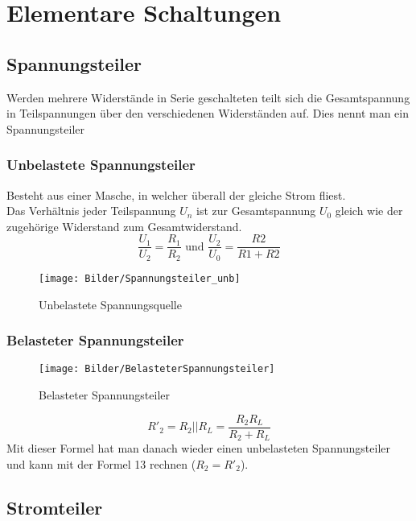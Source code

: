 \documentclass{article}
\begin{document}
\section{Elementare Schaltungen}
\subsection{Spannungsteiler}
Werden mehrere Widerstände in Serie geschalteten teilt sich die Gesamtspannung in Teilspannungen über den verschiedenen Widerständen auf. Dies nennt man ein Spannungsteiler
\subsubsection{Unbelastete Spannungsteiler}
Besteht aus einer Masche, in welcher überall der gleiche Strom fliest. \\
Das Verhältnis jeder Teilspannung $U_n$ ist zur Gesamtspannung $U_0$ gleich wie der zugehörige Widerstand zum Gesamtwiderstand. 
\begin{equation}
	\frac{U_1}{U_2} = \frac{R_1}{R_2} \textrm{ und } \frac{U_2}{U_0} = \frac{R2}{R1 + R2}
\end{equation}
\begin{figure}[htbp]
	\centering
	\texttt{[image: Bilder/Spannungsteiler\_unb]}
	\caption{Unbelastete Spannungsquelle}
\end{figure}
\subsubsection{Belasteter Spannungsteiler}
\begin{figure}[htbp]
	\centering
	\texttt{[image: Bilder/BelasteterSpannungsteiler]}
	\caption{Belasteter Spannungsteiler}
\end{figure}
\begin{equation}
	R'_2 = R_2 || R_L = \frac{R_2 R_L}{R_2 + R_L}
\end{equation}
Mit dieser Formel hat man danach wieder einen unbelasteten Spannungsteiler und kann mit der Formel 13 rechnen ($R_2 = R'_2$).
\subsection{Stromteiler}
\end{document}
